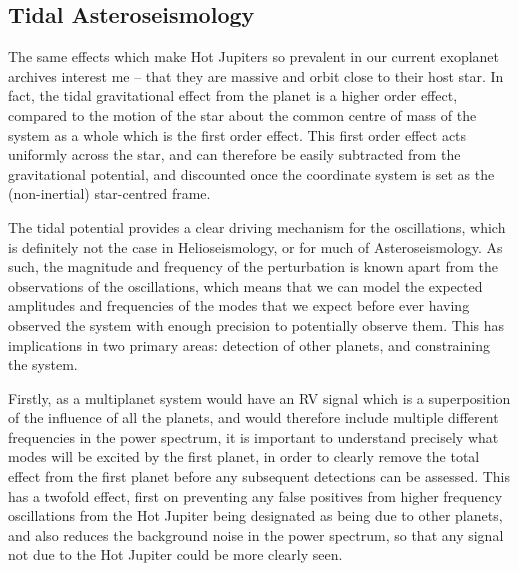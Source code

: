 \documentclass[11pt]{amsart}
\begin{document}
\subsection{Tidal Asteroseismology} \label{Intro:TidalAstero}

The same effects which make Hot Jupiters so prevalent in our current exoplanet archives interest me -- that they are massive and orbit close to their host star.  In fact, the tidal gravitational effect from the planet is a higher order effect, compared to the motion of the star about the common centre of mass of the system as a whole which is the first order effect.  This first order effect acts uniformly across the star, and can therefore be easily subtracted from the gravitational potential, and discounted once the coordinate system is set as the (non-inertial) star-centred frame.

The tidal potential provides a clear driving mechanism for the oscillations, which is definitely not the case in Helioseismology, or for much of Asteroseismology.  As such, the magnitude and frequency of the perturbation is known apart from the observations of the oscillations, which means that we can model the expected amplitudes and frequencies of the modes that we expect before ever having observed the system with enough precision to potentially observe them.  This has implications in two primary areas: detection of other planets, and constraining the system.

Firstly, as a multiplanet system would have an RV signal which is a superposition of the influence of all the planets, and would therefore include multiple different frequencies in the power spectrum, it is important to understand precisely what modes will be excited by the first planet, in order to clearly remove the total effect from the first planet before any subsequent detections can be assessed.  This has a twofold effect, first on preventing any false positives from higher frequency oscillations from the Hot Jupiter being designated as being due to other planets, and also reduces the background noise in the power spectrum, so that any signal not due to the Hot Jupiter could be more clearly seen.
\end{document}
